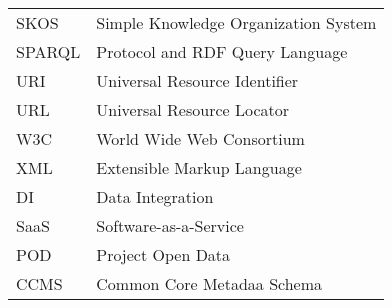 \begin{longtable}{lp{9cm}}
 SKOS &  Simple Knowledge Organization System \\
 SPARQL & Protocol and RDF Query Language \\
 URI & Universal Resource Identifier \\
 URL & Universal Resource Locator \\
 W3C & World Wide Web Consortium \\
 XML & Extensible Markup Language \\
 DI & Data Integration \\
 SaaS & Software-as-a-Service \\
 POD & Project Open Data \\
 CCMS & Common Core Metadaa Schema
\end{longtable}

